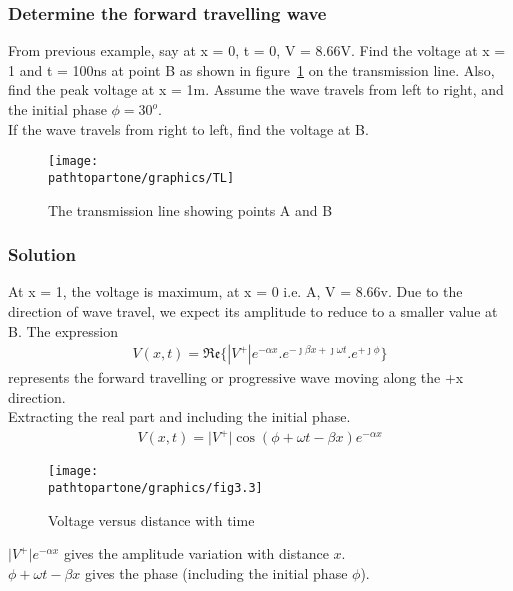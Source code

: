 \begin{exmp}
\subsubsection*{Determine the forward travelling wave}\label{exmp:forward}
From previous example, say at x = 0, t = 0, V = 8.66V. Find the voltage at x = 1 and t = 100ns at point B as shown in figure~\ref{fig:tl} on the transmission line. Also, find the peak voltage at x = 1m. Assume the wave travels from left to right, and the initial phase $\phi = 30^o$.\\
If the wave travels from right to left, find the voltage at B.
\begin{figure}[h]
\centering
\texttt{[image: \\pathtopartone/graphics/TL]}
\caption{The transmission line showing points A and B}
\label{fig:tl}
\end{figure}

\subsubsection*{Solution}
At x = 1, the voltage is maximum, at x = 0 i.e. A, V = 8.66v. Due to the direction of wave travel, we expect its amplitude to reduce to a smaller value at B. The expression
\begin{align}
V(x,t) = \mathfrak{Re}\{\left| V^+\right| e^{-\alpha x}.e^{-\jmath\beta x + \jmath\omega t}.e^{+\jmath\phi}\} 
\label{eqn:voltagelec3soln}
\end{align}
represents the forward travelling or progressive wave moving along the +x direction.\\
Extracting the real part and including the initial phase.
\begin{align*}
V(x,t) = \lvert V^+\rvert\cos(\phi + \omega t - \beta x)e^{-\alpha x}
\end{align*}
\begin{figure}[h]
\centering
\texttt{[image: \\pathtopartone/graphics/fig3.3]}
\caption{Voltage versus distance with time}
\end{figure}

$\lvert V^+\rvert e^{-\alpha x} $ gives the amplitude variation with distance $ x $. \\
$ \phi + \omega t - \beta x $ gives the phase (including the initial phase $ \phi $).


\end{exmp}
